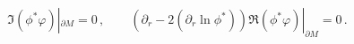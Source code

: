 \begin{equation}
\Im \left( \phi^* \varphi \right)|_{\partial M}=0 \,,\qquad
\left( \partial_r -2(\partial_r \ln \phi^* ) \right)\Re 
\left( \phi^* \varphi \right)|_{\partial M}=0 \,.\label{bcphi}
\end{equation}

